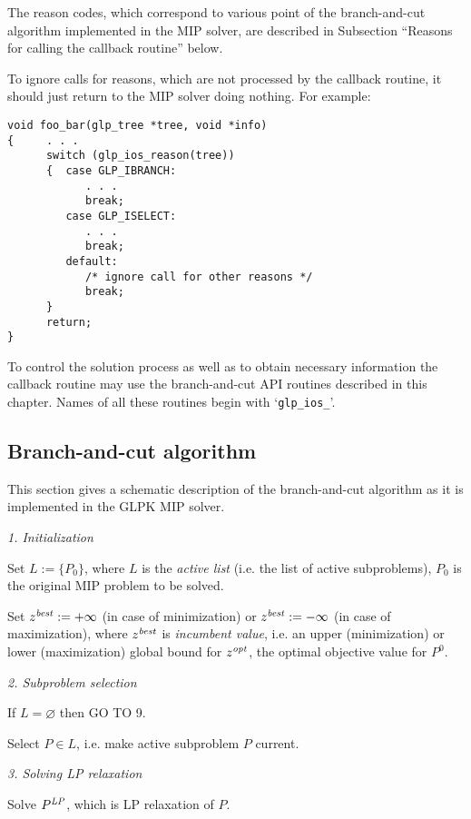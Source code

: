 The reason codes, which correspond to various point of the
branch-and-cut algorithm implemented in the MIP solver, are described
in Subsection ``Reasons for calling the callback routine'' below.

To ignore calls for reasons, which are not processed by the callback
routine, it should just return to the MIP solver doing nothing. For
example:

\begin{verbatim}
void foo_bar(glp_tree *tree, void *info)
{     . . .
      switch (glp_ios_reason(tree))
      {  case GLP_IBRANCH:
            . . .
            break;
         case GLP_ISELECT:
            . . .
            break;
         default:
            /* ignore call for other reasons */
            break;
      }
      return;
}
\end{verbatim}

To control the solution process as well as to obtain necessary
information the callback routine may use the branch-and-cut API
routines described in this chapter. Names of all these routines begin
with `\verb|glp_ios_|'.

\subsection{Branch-and-cut algorithm}

This section gives a schematic description of the branch-and-cut
algorithm as it is implemented in the GLPK MIP solver.

\medskip

{\it 1. Initialization}

Set $L:=\{P_0\}$, where $L$ is the {\it active list} (i.e. the list of
active subproblems), $P_0$ is the original MIP problem to be solved.

Set $z^{\it best}:=+\infty$ (in case of minimization) or
$z^{\it best}:=-\infty$ (in case of maximization), where $z^{\it best}$
is {\it incumbent value}, i.e. an upper (minimization) or lower
(maximization) global bound for $z^{\it opt}$, the optimal objective
value for $P^0$.

\medskip

{\it 2. Subproblem selection}

If $L=\varnothing$ then GO TO 9.

Select $P\in L$, i.e. make active subproblem $P$ current.

\medskip

{\it 3. Solving LP relaxation}

Solve $P^{\it LP}$, which is LP relaxation of $P$.

